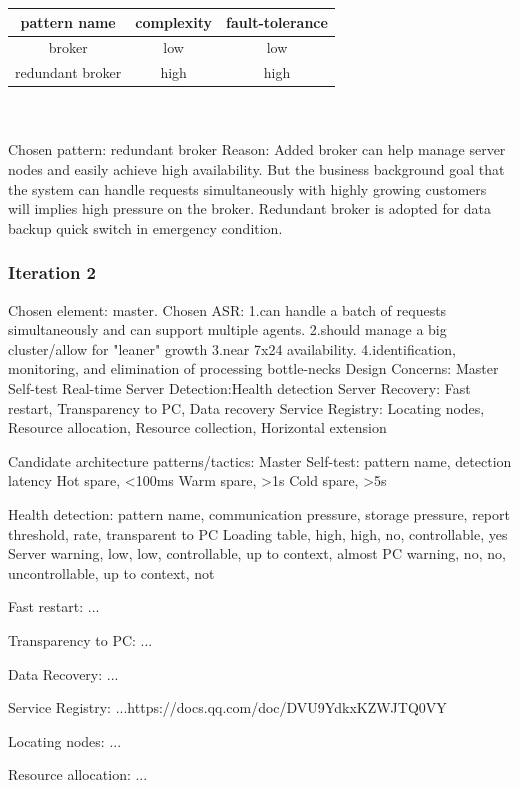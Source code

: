 \documentclass{article}
\begin{document}
		\begin{tabular}{|c|c|c|}
			\hline
			pattern name & complexity& fault-tolerance\\
			\hline
			broker& low& low\\
			\hline
			redundant broker& high& high\\
			\hline
		\end{tabular}
		\\\\
		Chosen pattern: redundant broker
		Reason: Added broker can help manage server nodes and easily achieve high availability. But the business background goal that the system can handle requests simultaneously with highly growing customers will implies high pressure on the broker. Redundant broker is adopted for data backup quick switch in emergency condition. 

		\subsubsection{Iteration 2}
		Chosen element: master.
		Chosen ASR: 
		1.can handle a batch of requests simultaneously and can support multiple agents.
		2.should manage a big cluster/allow for "leaner" growth
		3.near 7x24 availability.
		4.identification, monitoring, and elimination of processing bottle-necks
		Design Concerns:
		Master Self-test
		Real-time Server Detection:Health detection
		Server Recovery: Fast restart, Transparency to PC, Data recovery
		Service Registry: Locating nodes, Resource allocation, Resource collection, Horizontal extension

		Candidate architecture patterns/tactics:
		Master Self-test:
			pattern name, detection latency
			Hot spare, <100ms
			Warm spare, >1s
			Cold spare, >5s

		Health detection:
			pattern name, communication pressure, storage pressure, report threshold, rate, transparent to PC
			Loading table, high, high, no, controllable, yes 
			Server warning, low, low, controllable, up to context, almost
			PC warning, no, no, uncontrollable, up to context, not
		
		Fast restart:
			...
		
		Transparency to PC:
			...
		
		Data Recovery:
			...
		
		Service Registry:
			...https://docs.qq.com/doc/DVU9YdkxKZWJTQ0VY
		
		Locating nodes:
			... 

		Resource allocation:
			...
\end{document}
